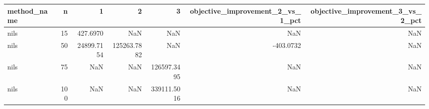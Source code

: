 \begin{tabular}{lrrrrrr}
\toprule
method_name & n & 1 & 2 & 3 & objective_improvement_2_vs_1_pct & objective_improvement_3_vs_2_pct \\
\midrule
nils & 15 & 427.6970 & NaN & NaN & NaN & NaN \\
nils & 50 & 24899.7154 & 125263.7882 & NaN & -403.0732 & NaN \\
nils & 75 & NaN & NaN & 126597.3495 & NaN & NaN \\
nils & 100 & NaN & NaN & 339111.5016 & NaN & NaN \\
\bottomrule
\end{tabular}
